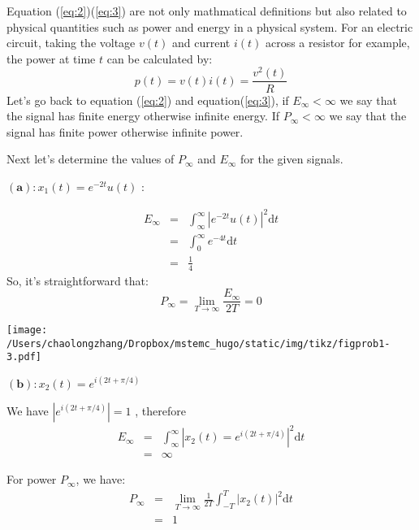 \documentclass[koma,a4paper,utopia,12pt,listings-color,microtype,paralist,colorlinks,urlcolor=red]{org-article}
\begin{document}
Equation (\ref{eq:2})(\ref{eq:3}) are not only mathmatical definitions but also
related to physical quantities such as power and energy in a physical system.
For an electric circuit, taking the voltage \(v(t)\) and current \(i(t)\) across
a resistor for example, the power at time \(t\) can be calculated by:
\begin{equation}
\label{eq:4}
p(t) = v(t)i(t) = \frac{v^{2}(t)}{R}
\end{equation}
Let's go back to equation (\ref{eq:2}) and equation(\ref{eq:3}), if
\(E_{\infty}< \infty\) we say that the signal has finite energy otherwise
infinite energy. If \(P_{\infty} <\infty\) we say that the signal has finite
power otherwise infinite power.

Next let's determine the values of \(P_{\infty}\) and \(E_{\infty}\) for the
given signals.

\(\mathbf{(a)}: x_{1}(t)= e^{-2t}u(t)\) :

\begin{eqnarray*}
E_{\infty}  & =  & \int_{\infty}^{\infty} |e^{-2t}u(t)|^{2} \mathrm{d}t \\
&=& \int_{0}^{\infty} e^{-4t} \mathrm{d}t \\
&=& \frac{1}{4}
\end{eqnarray*}
So, it's straightforward that:
\begin{equation}
\label{eq:5}
P_{\infty} = \lim_{T\to \infty} \frac{E_{\infty}}{2T}  = 0
\end{equation}


\begin{center}
\texttt{[image: /Users/chaolongzhang/Dropbox/mstemc\_hugo/static/img/tikz/figprob1-3.pdf]}
\end{center}



\(\mathbf{(b)}: x_{2}(t)= e^{i(2t+\pi/4)}\)

We have \(|e^{i(2t+\pi/4)}| = 1\) , therefore
\begin{eqnarray*}
E_{\infty}&=& \int_{\infty}^{\infty} |x_{2}(t)= e^{i(2t+\pi/4)}|^{2} \mathrm{d}t \\
&=& \infty
\end{eqnarray*}

For power \(P_{\infty}\), we have:
\begin{eqnarray*}
P_{\infty}&= &\lim_{T\to\infty} \frac{1}{2T}\int_{-T}^{T} |x_{2}(t)|^{2} \mathrm{d}t  \\
&=& 1
\end{eqnarray*}
\end{document}
